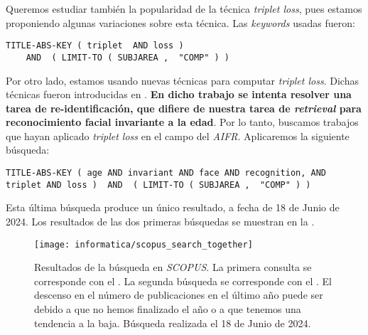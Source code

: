 Queremos estudiar también la popularidad de la técnica \textit{triplet loss}, pues estamos proponiendo algunas variaciones sobre esta técnica. Las \textit{keywords} usadas fueron:

\begin{lstlisting}[caption=\textit{Keywords usadas para la búsqueda en \textit{SCOPUS} para consultar la popularidad del \textit{triplet loss}. }, label=code:scopus_search_tripletloss, captionpos=b]
    TITLE-ABS-KEY ( triplet  AND loss )
    AND  ( LIMIT-TO ( SUBJAREA ,  "COMP" ) )
\end{lstlisting}

Por otro lado, estamos usando nuevas técnicas para computar \textit{triplet loss}. Dichas técnicas fueron introducidas en \cite{informatica:principal}. \textbf{En dicho trabajo se intenta resolver una tarea de re-identificación, que difiere de nuestra tarea de \textit{retrieval} para reconocimiento facial invariante a la edad}. Por lo tanto, buscamos trabajos que hayan aplicado \textit{triplet loss} en el campo del \textit{AIFR}. Aplicaremos la siguiente búsqueda:

\begin{lstlisting}[caption=Keywords usandos para la búsqueda de trabajos que combinen \textit{AIFR} y \textit{triplet loss} en \textit{SCOPUS}, label=code:scopus_search_especifico, captionpos=b]
    TITLE-ABS-KEY ( age AND invariant AND face AND recognition, AND triplet AND loss )  AND  ( LIMIT-TO ( SUBJAREA ,  "COMP" ) )
\end{lstlisting}

Esta última búsqueda produce un único resultado, a fecha de 18 de Junio de 2024. Los resultados de las dos primeras búsquedas se muestran en la .

\begin{figure}[!hbtp]
	\centering
	\texttt{[image: informatica/scopus\_search\_together]}
	\caption{Resultados de la búsqueda en \textit{SCOPUS}. La primera consulta se corresponde con el . La segunda búsqueda se corresponde con el . El descenso en el número de publicaciones en el último año puede ser debido a que no hemos finalizado el año o a que tenemos una tendencia a la baja. Búsqueda realizada el 18 de Junio de 2024.}
	\label{img:scopus_together}
\end{figure}

